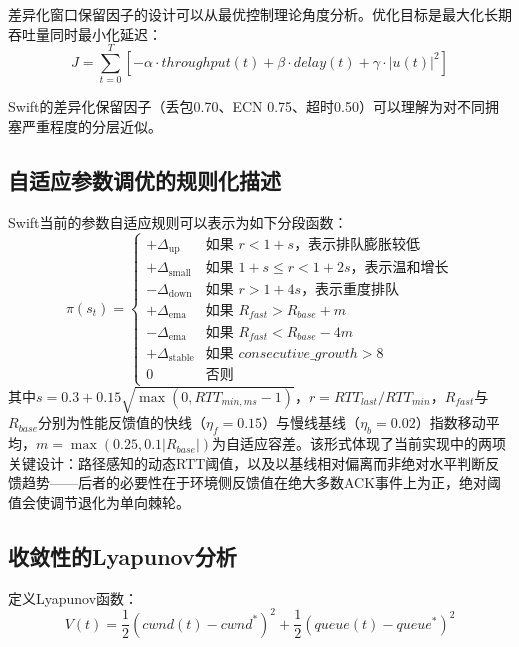 差异化窗口保留因子的设计可以从最优控制理论角度分析。优化目标是最大化长期吞吐量同时最小化延迟：
\begin{equation}
J = \sum_{t=0}^{T} \left[ -\alpha \cdot throughput(t) + \beta \cdot delay(t) + \gamma \cdot |u(t)|^2 \right]
\end{equation}

Swift的差异化保留因子（丢包0.70、ECN 0.75、超时0.50）可以理解为对不同拥塞严重程度的分层近似。

\subsection{自适应参数调优的规则化描述}

Swift当前的参数自适应规则可以表示为如下分段函数：
\begin{equation}
\pi(s_t) = \begin{cases}
+\Delta_{\text{up}} & \text{如果~} r < 1+s \text{，表示排队膨胀较低} \\
+\Delta_{\text{small}} & \text{如果~} 1+s \le r < 1+2s \text{，表示温和增长} \\
-\Delta_{\text{down}} & \text{如果~} r > 1+4s \text{，表示重度排队} \\
+\Delta_{\text{ema}} & \text{如果~} R_{fast} > R_{base} + m \\
-\Delta_{\text{ema}} & \text{如果~} R_{fast} < R_{base} - 4m \\
+\Delta_{\text{stable}} & \text{如果~} consecutive\_growth > 8 \\
0 & \text{否则}
\end{cases}
\end{equation}
其中$s = 0.3 + 0.15\sqrt{\max(0, RTT_{min,ms}-1)}$，$r=RTT_{last}/RTT_{min}$，$R_{fast}$与$R_{base}$分别为性能反馈值的快线（$\eta_f=0.15$）与慢线基线（$\eta_b=0.02$）指数移动平均，$m = \max(0.25, 0.1|R_{base}|)$为自适应容差。该形式体现了当前实现中的两项关键设计：路径感知的动态RTT阈值，以及以基线相对偏离而非绝对水平判断反馈趋势——后者的必要性在于环境侧反馈值在绝大多数ACK事件上为正，绝对阈值会使调节退化为单向棘轮。

\subsection{收敛性的Lyapunov分析}

定义Lyapunov函数：
\begin{equation}
V(t) = \frac{1}{2}(cwnd(t) - cwnd^*)^2 + \frac{1}{2}(queue(t) - queue^*)^2
\end{equation}

